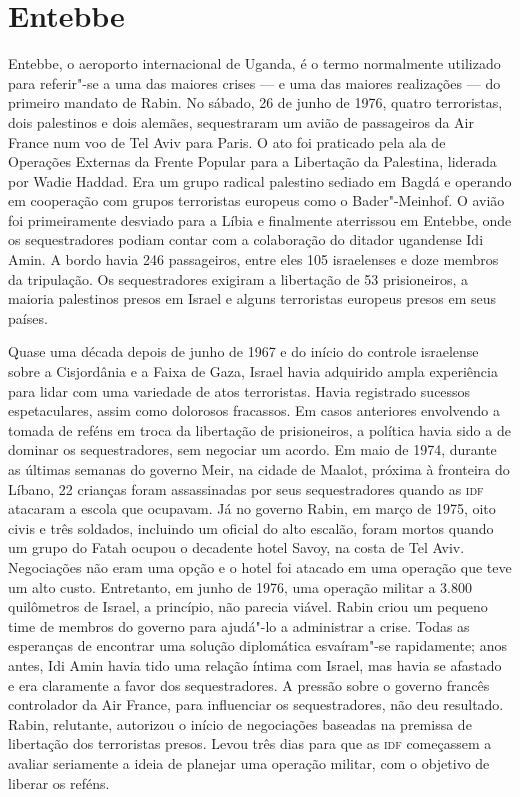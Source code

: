 \section{Entebbe}

Entebbe, o aeroporto internacional de Uganda, é o termo normalmente
utilizado para referir"-se a uma das maiores crises --- e uma das maiores
realizações --- do primeiro mandato de Rabin. No sábado, 26 de junho de
1976, quatro terroristas, dois palestinos e dois alemães, sequestraram
um avião de passageiros da Air France num voo de Tel Aviv para Paris. O
ato foi praticado pela ala de Operações Externas da Frente Popular para a Libertação da Palestina, liderada por Wadie Haddad. Era um grupo radical
palestino sediado em Bagdá e operando em cooperação com grupos
terroristas europeus como o Bader"-Meinhof. O avião foi primeiramente
desviado para a Líbia e finalmente aterrissou em Entebbe, onde os
sequestradores podiam contar com a colaboração do ditador ugandense Idi
Amin. A bordo havia 246 passageiros, entre eles 105 israelenses e doze
membros da tripulação. Os sequestradores exigiram a libertação de 53
prisioneiros, a maioria palestinos presos em Israel e alguns terroristas
europeus presos em seus países.

Quase uma década depois de junho de 1967 e do início do controle
israelense sobre a Cisjordânia e a Faixa de Gaza, Israel havia adquirido
ampla experiência para lidar com uma variedade de atos terroristas.
Havia registrado sucessos espetaculares, assim como dolorosos fracassos.
Em casos anteriores envolvendo a tomada de reféns em troca da libertação
de prisioneiros, a política havia sido a de dominar os sequestradores,
sem negociar um acordo. Em maio de 1974, durante as últimas semanas do
governo Meir, na cidade de Maalot, próxima à fronteira do Líbano,
22 crianças foram assassinadas por seus sequestradores quando
as \textsc{idf} atacaram a escola que ocupavam. Já no governo Rabin, em março de
1975, oito civis e três soldados, incluindo um oficial do alto escalão,
foram mortos quando um grupo do Fatah ocupou o decadente hotel Savoy, na
costa de Tel Aviv. Negociações não eram uma opção e o hotel foi atacado
em uma operação que teve um alto custo. Entretanto, em junho de 1976, uma
operação militar a 3.800 quilômetros de Israel, a princípio, não parecia
viável. Rabin criou um pequeno time de membros do governo para ajudá"-lo
a administrar a crise. Todas as esperanças de encontrar uma solução
diplomática esvaíram"-se rapidamente; anos antes, Idi Amin havia tido uma
relação íntima com Israel, mas havia se afastado e era claramente a
favor dos sequestradores. A pressão sobre o governo francês controlador
da Air France, para influenciar os sequestradores, não deu resultado.
Rabin, relutante, autorizou o início de negociações baseadas na premissa
de libertação dos terroristas presos. Levou três dias para que as \textsc{idf}
começassem a avaliar seriamente a ideia de planejar uma operação
militar, com o objetivo de liberar os reféns.

